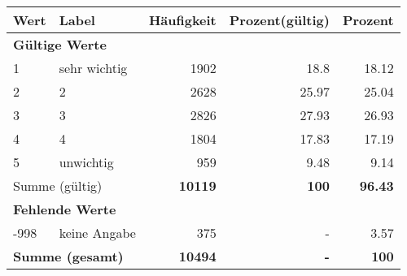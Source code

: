      \begin{longtable}{lXrrr}
     \toprule
     \textbf{Wert} & \textbf{Label} & \textbf{Häufigkeit} & \textbf{Prozent(gültig)} & \textbf{Prozent} \\
     \endhead
     \midrule
     \multicolumn{5}{l}{\textbf{Gültige Werte}}\\

     1 &
     \multicolumn{1}{X}{ sehr wichtig   } &


       \num{1902} &
       \num[round-mode=places,round-precision=2]{18.8} &
         \num[round-mode=places,round-precision=2]{18.12} \\

     2 &
     \multicolumn{1}{X}{ 2   } &


       \num{2628} &
       \num[round-mode=places,round-precision=2]{25.97} &
         \num[round-mode=places,round-precision=2]{25.04} \\

     3 &
     \multicolumn{1}{X}{ 3   } &


       \num{2826} &
       \num[round-mode=places,round-precision=2]{27.93} &
         \num[round-mode=places,round-precision=2]{26.93} \\

     4 &
     \multicolumn{1}{X}{ 4   } &


       \num{1804} &
       \num[round-mode=places,round-precision=2]{17.83} &
         \num[round-mode=places,round-precision=2]{17.19} \\

     5 &
     \multicolumn{1}{X}{ unwichtig   } &


       \num{959} &
       \num[round-mode=places,round-precision=2]{9.48} &
         \num[round-mode=places,round-precision=2]{9.14} \\
     \midrule
     \multicolumn{2}{l}{Summe (gültig)} &
       \textbf{\num{10119}} &
     \textbf{\num{100}} &
       \textbf{\num[round-mode=places,round-precision=2]{96.43}} \\
     \multicolumn{5}{l}{\textbf{Fehlende Werte}}\\
       -998 &
       keine Angabe &
         \num{375} &
        - &
         \num[round-mode=places,round-precision=2]{3.57} \\
     \midrule
     \multicolumn{2}{l}{\textbf{Summe (gesamt)}} &
          \textbf{\num{10494}} &
        \textbf{-} &
        \textbf{\num{100}} \\
     \bottomrule
     \end{longtable}
     
